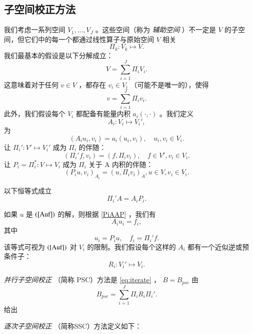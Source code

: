 \documentclass[12pt]{acta_2011xz}
\newcommand{\Rf}[1]{\mbox{$(\ref{#1})$}}
\begin{document}
   \subsection{子空间校正方法  }       \label{sec:msc}    我们考虑一系列空间    $V_{1},\ldots,V_{J}$    。这些空间（称为  {    \it    辅助空间   }  ）不一定是    $V$    的子空间，但它们中的每一个都通过线性算子与原始空间    $V$    相关
   \begin{equation}
  \label{Pai-k}
\Pi_k: V_k\mapsto V.   
\end{equation}    我们最基本的假设是以下分解成立：
   \begin{equation}
  \label{aux-decomp}
V=\sum_{i=1}^J\Pi_iV_i. 
\end{equation}    这意味着对于任何    $v\in V$    ，都存在    $v_i\in V_i$   （可能不是唯一的），使得
   \begin{equation}
  \label{aux-decomp0}
v=\sum_{i=1}^J\Pi_iv_i.   
\end{equation}    此外，我们假设每个    $V_i$    都配备有能量内积
   $a_i(\cdot,\cdot)$    。我们定义
   $$
A_i:  V_i\mapsto V_i',
$$    为
   $$
(A_iu_i,v_i)=a_i(u_i,v_i), \quad u_i,v_i\in V_i. 
$$    让    $\Pi_i':  V'\mapsto V_i'$    成为    $\Pi_i$    的伴随：
   $$
(\Pi_i'f, v_i)=(f,\Pi_i v_i), \quad f\in V',  v_i\in V_i.
$$    让    $P_i=\Pi_i^*: V\mapsto V_i$    成为    $\Pi_i$    关于 A 内积的伴随：
   $$
(P_iu,v_i)_{A_i}=(u,\Pi_iv_i)_{A}, u\in V, v_i\in V_i.
$$     

以下恒等式成立
   \begin{equation}
  \label{PiAAP}
  \Pi_i'A=A_iP_i.
\end{equation}     

如果    $u$    是    \Rf{Auf}    的解，则根据    \eqref{PiAAP}    ，我们有
   \begin{equation}
\label{3.3a}A_iu_i=f_i,
\end{equation}    其中
   $$
u_i=P_iu, \quad f_i=\Pi_i'f.
$$    该等式可视为    \Rf{Auf}    对
   $V_i$    的限制。我们假设每个这样的    $A_i$    都有一个近似逆或预条件子：
   \begin{equation}
  \label{Ri}
R_i: V_i'\mapsto V_i.   
\end{equation}     

 {    \it   并行子空间校正   } （简称 PSC）方法是
   \eqref{eq:iterate}   ，   $B=B_{psc}$    由
   \begin{equation}
  \label{PSC}
B_{psc}=\sum_{i=1}^J\Pi_iR_i\Pi_i'.
\end{equation}    给出  

 {    \it    逐次子空间校正   } （简称SSC）方法定义如下：  
\end{document}
